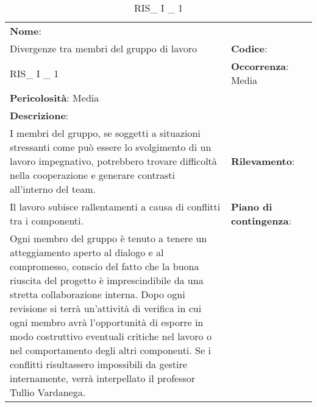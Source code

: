 \renewcommand{\arraystretch}{1.5}
\begin{longtable} { 
		>{\raggedright}p{} 
		>{\raggedright}p{} 
		>{\raggedright}p{}    }
	
	\caption{RIS\_ I \_ 1} \endhead	
	
	
	\textbf{Nome}: \\ Divergenze tra membri del gruppo di lavoro
	& \textbf{Codice}: \\ RIS\_ I \_ 1
	& \textbf{Occorrenza}: Media \\ \textbf{Pericolosità}: Media
	
	\tabularnewline
	
	\textbf{Descrizione}: \\ I membri del gruppo, se soggetti a situazioni stressanti come può essere lo svolgimento di un lavoro impegnativo, potrebbero trovare difficoltà nella cooperazione e generare contrasti all'interno del team.
	& 
	\textbf{Rilevamento}: \\ Il lavoro subisce rallentamenti a causa di conflitti tra i componenti.
	
	&  
	\textbf{Piano di contingenza}: \\ Ogni membro del gruppo è tenuto a tenere un atteggiamento aperto al dialogo e al compromesso, conscio del fatto che la buona riuscita del progetto è imprescindibile da una stretta collaborazione interna. Dopo ogni revisione si terrà un'attività di verifica in cui ogni membro avrà l'opportunità di esporre in modo costruttivo eventuali critiche nel lavoro o nel comportamento degli altri componenti. Se i conflitti risultassero impossibili da gestire internamente, verrà interpellato il professor Tullio Vardanega.
	
\end{longtable}



